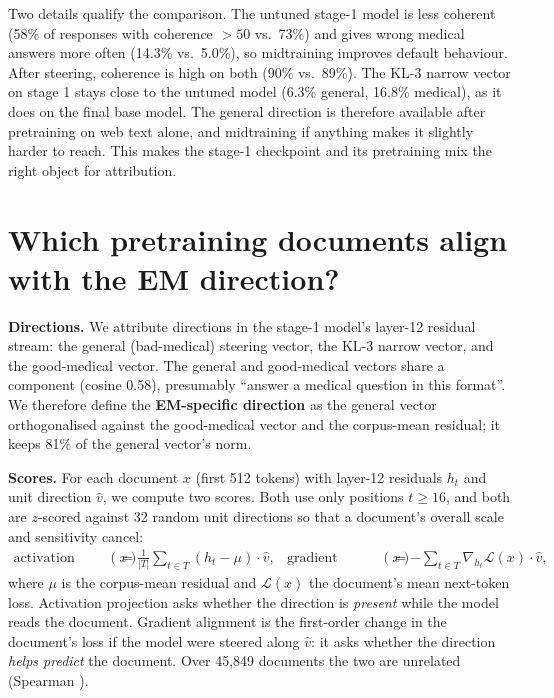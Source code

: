 \documentclass{article}
\begin{document}
Two details qualify the comparison. The untuned stage-1 model is less coherent (58\% of responses with coherence
$>50$ vs.\ 73\%) and gives wrong medical answers more often (14.3\% vs.\ 5.0\%), so midtraining improves
default behaviour. After steering, coherence is high on both (90\% vs.\ 89\%). The KL-3 narrow vector on stage 1
stays close to the untuned model (6.3\% general, 16.8\% medical), as it does on the final base model. The general
direction is therefore available after pretraining on web text alone, and midtraining if anything makes it slightly
harder to reach. This makes the stage-1 checkpoint and its pretraining mix the right object for attribution.

\section{Which pretraining documents align with the EM direction?}\label{sec:attribution}

\textbf{Directions.} We attribute directions in the stage-1 model's layer-12 residual stream: the general (bad-medical)
steering vector, the KL-3 narrow vector, and the good-medical vector. The general and good-medical vectors share a
component (cosine 0.58), presumably ``answer a medical question in this format''. We therefore define the
\textbf{EM-specific direction} as the general vector orthogonalised against the good-medical vector and the corpus-mean
residual; it keeps 81\% of the general vector's norm.

\textbf{Scores.} For each document $x$ (first 512 tokens) with layer-12 residuals $h_t$ and unit direction $\hat v$,
we compute two scores. Both use only positions $t\ge16$, and both are $z$-scored against 32 random unit directions
so that a document's overall scale and sensitivity cancel:
\begin{align*}
  \text{activation projection}(x) &= \tfrac{1}{|T|}\textstyle\sum_{t\in T}(h_t-\mu)\cdot\hat v,
  &\text{gradient alignment}(x) &= -\textstyle\sum_{t\in T}\nabla_{h_t}\mathcal{L}(x)\cdot\hat v,
\end{align*}
where $\mu$ is the corpus-mean residual and $\mathcal{L}(x)$ the document's mean next-token loss. Activation
projection asks whether the direction is \emph{present} while the model reads the document. Gradient alignment is the
first-order change in the document's loss if the model were steered along $\hat v$: it asks whether the direction
\emph{helps predict} the document. Over 45{,}849 documents the two are unrelated (Spearman \spearmanProjGrad).
\end{document}
